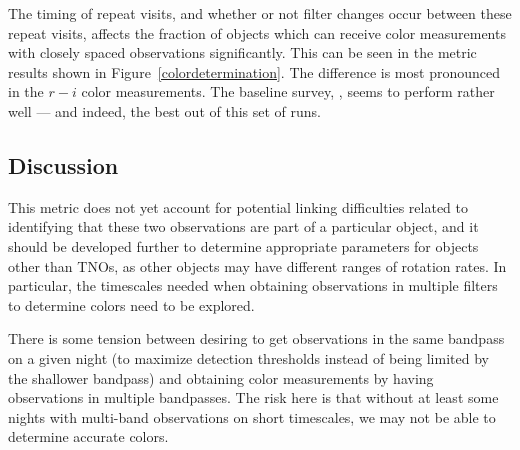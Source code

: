 The timing of repeat visits, and whether or not filter changes occur
between these repeat visits, affects the fraction of objects which can
receive color measurements with closely spaced observations
significantly. This can be seen in the metric results shown in
Figure~\ref{colordetermination}. The difference is most pronounced in
the $r-i$ color measurements. The baseline survey,
, seems to perform rather well --- and
indeed, the best out of this set of runs.



\subsection{Discussion}
\label{sec:\secname:discussion}

This metric does not yet account for potential linking difficulties
related to identifying that these two observations are part of a
particular object, and it should be developed further to determine
appropriate parameters for objects other than TNOs, as other objects
may have different ranges of rotation rates. In particular, the
timescales needed when obtaining observations in multiple filters to
determine colors need to be explored.

There is some tension between desiring to get observations in the same
bandpass on a given night (to maximize detection thresholds instead
of being limited by the shallower bandpass) and obtaining color
measurements by having observations in multiple bandpasses. The risk
here is that without at least some nights with multi-band observations
on short timescales, we may not be able to determine accurate colors.


\navigationbar
